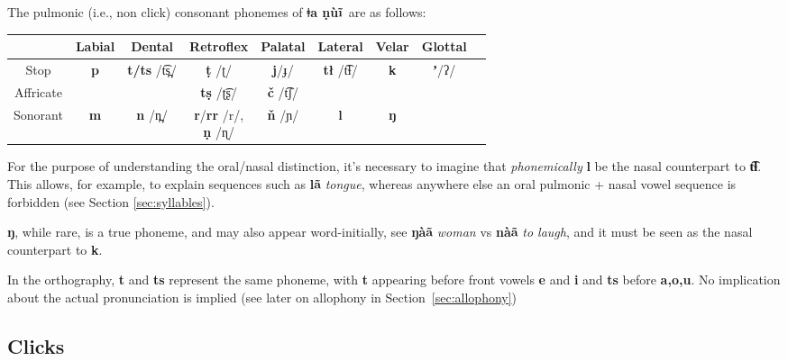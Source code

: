 \documentclass[11pt]{book}
\newcommand{\qcn}[1]{\textbf{#1}}
\newcommand{\langname}{\qcn{ǂa ṇùĩ}~}
\newcommand{\transl}[2]{\qcn{#1} \emph{#2}}
\begin{document}
The pulmonic (i.e., non click) consonant phonemes of \langname are as follows:

\renewcommand{\arraystretch}{2}


\begin{center}
\begin{tabular}{|c|c|c|c|c|c|c|c|c|}
\hline 
 & Labial & Dental & Retroflex & Palatal & Lateral & Velar & Glottal\\ \hline \hline
Stop & \qcn{p} & \multirow{2}{*}{\qcn{t/ts} /t͡s̪/}  & \qcn{ṭ} /ʈ/ & 	\qcn{j}/ɟ/ & \multirow{2}{*}{\qcn{tł} /t͡ɬ/}	 	&	\multirow{2}{*}{\qcn{k}} &  	\qcn{ʼ}/ʔ/ \\ \cline{1-2} \cline{4-5} \cline{8-8}
Affricate &  &  & \qcn{tṣ} /ʈ͡ʂ/ & 	\qcn{č} /t͡ʃ/ & 	&  &  	 \\ \hline
Sonorant & \qcn{m} &  \qcn{n} /n̪/ &\makecell{\qcn{r}/\qcn{rr} /r/,\\ \qcn{ṇ} /ɳ/} & \qcn{ň} /ɲ/ & \qcn{l} & \qcn{ŋ} & \\\hline
\end{tabular}
\end{center}

For the purpose of understanding the oral/nasal distinction, it's necessary to imagine that \emph{phonemically} \qcn{l} be the nasal counterpart to \qcn{t͡ɬ}. This allows, for example, to explain sequences such as \transl{lã}{tongue}, whereas anywhere else an oral pulmonic + nasal vowel sequence is forbidden (see Section \ref{sec:syllables}).

\qcn{ŋ}, while rare, is a true phoneme, and may also appear word-initially, see \transl{ŋàã}{woman} vs \transl{nàã}{to laugh}, and it must be seen as the nasal counterpart to \qcn{k}.

In the orthography, \qcn{t} and \qcn{ts} represent the same phoneme, with \qcn{t} appearing before front vowels \qcn{e} and \qcn{i} and \qcn{ts} before \qcn{a,o,u}. No implication about the actual pronunciation is implied (see later on allophony in Section~\ref{sec:allophony})

\subsection{Clicks}
\end{document}
